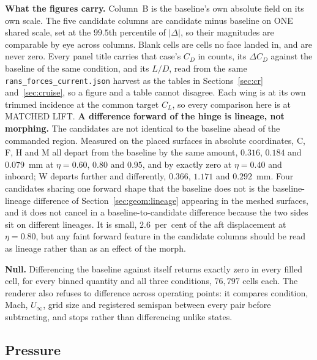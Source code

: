 \textbf{What the figures carry.} Column~B is the baseline's own absolute field on its own scale.
The five candidate columns are candidate minus baseline on ONE shared scale, set at the
$99.5$th percentile of $|\Delta|$, so their magnitudes are comparable by eye across columns.
Blank cells are cells no face landed in, and are never zero. Every panel title carries that
case's $C_D$ in counts, its $\Delta C_D$ against the baseline of the same condition, and its
$L/D$, read from the same \texttt{rans\_forces\_current.json} harvest as the tables in
Sections~\ref{sec:cr} and~\ref{sec:cruise}, so a figure and a table cannot disagree. Each wing is
at its own trimmed incidence at the common target $C_L$, so every comparison here is at MATCHED
LIFT.
\textbf{A difference forward of the hinge is lineage, not morphing.} The candidates are not
identical to the baseline ahead of the commanded region. Measured on the placed surfaces in
absolute coordinates, C, F, H and M all depart from the baseline by the same amount, $0.316$,
$0.184$ and $0.079$~mm at $\eta = 0.60$, $0.80$ and $0.95$, and by exactly zero at
$\eta = 0.40$ and inboard; W departs further and differently, $0.366$, $1.171$ and $0.292$~mm.
Four candidates sharing one forward shape that the baseline does not is the baseline-lineage
difference of Section~\ref{sec:geom:lineage} appearing in the meshed surfaces, and it does not
cancel in a
baseline-to-candidate difference because the two sides sit on different lineages. It is small,
$2.6$~per~cent of the aft displacement at $\eta = 0.80$, but any faint forward feature in the
candidate columns should be read as lineage rather than as an effect of the morph.

\textbf{Null.} Differencing the baseline against itself returns exactly zero in every filled
cell, for every binned quantity and all three conditions, $76{,}797$ cells each. The renderer also
refuses to difference across operating points: it compares condition, Mach, $U_\infty$, grid
size and registered semispan between every pair before subtracting, and stops rather than
differencing unlike states.

\subsection{Pressure}
\label{sec:deltamaps:cp}

